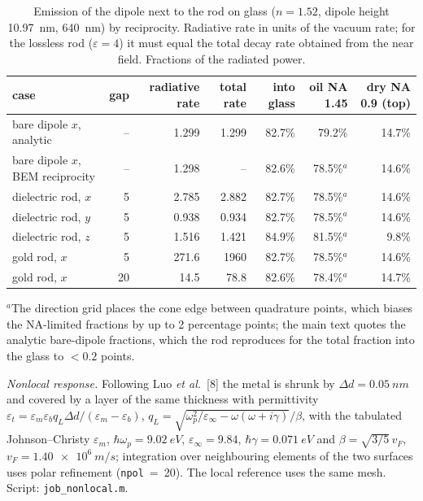 \documentclass[11pt,a4paper]{article}
\begin{document}
\begin{table}[h]\centering
\caption{Emission of the dipole next to the rod on glass ($n=1.52$, dipole height \SI{10.97}{nm}, \SI{640}{nm}) by
reciprocity. Radiative rate in units of the vacuum rate; for the lossless rod ($\varepsilon=4$) it must equal the total
decay rate obtained from the near field. Fractions of the radiated power.}\label{tab:recip}
\begin{tabular}{lrrrrrr}\toprule
case & gap & radiative rate & total rate & into glass & oil NA 1.45 & dry NA 0.9 (top)\\\midrule
bare dipole $x$, analytic & -- & 1.299 & 1.299 & 82.7\% & 79.2\% & 14.7\%\\
bare dipole $x$, BEM reciprocity & -- & 1.298 & -- & 82.6\% & 78.5\%$^a$ & 14.6\%\\
dielectric rod, $x$ & 5 & 2.785 & 2.882 & 82.7\% & 78.5\%$^a$ & 14.6\%\\
dielectric rod, $y$ & 5 & 0.938 & 0.934 & 82.7\% & 78.5\%$^a$ & 14.6\%\\
dielectric rod, $z$ & 5 & 1.516 & 1.421 & 84.9\% & 81.5\%$^a$ & 9.8\%\\
gold rod, $x$ & 5 & 271.6 & 1960 & 82.7\% & 78.5\%$^a$ & 14.6\%\\
gold rod, $x$ & 20 & 14.5 & 78.8 & 82.6\% & 78.4\%$^a$ & 14.7\%\\\bottomrule
\end{tabular}

\smallskip
{\footnotesize $^a$The direction grid places the cone edge between quadrature points, which biases the NA-limited
fractions by up to 2 percentage points; the main text quotes the analytic bare-dipole fractions, which the rod
reproduces for the total fraction into the glass to $<0.2$ points.}
\end{table}

\emph{Nonlocal response.} Following Luo \emph{et al.}~[8] the metal is shrunk by $\Delta d=\SI{0.05}{nm}$ and
covered by a layer of the same thickness with permittivity
$\varepsilon_t=\varepsilon_m\varepsilon_b q_L\Delta d/(\varepsilon_m-\varepsilon_b)$,
$q_L=\sqrt{\omega_p^2/\varepsilon_\infty-\omega(\omega+i\gamma)}/\beta$, with the tabulated Johnson--Christy
$\varepsilon_m$, $\hbar\omega_p=\SI{9.02}{eV}$, $\varepsilon_\infty=9.84$, $\hbar\gamma=\SI{0.071}{eV}$ and
$\beta=\sqrt{3/5}\,v_F$, $v_F=\SI{1.40e6}{m/s}$; integration over neighbouring elements of the two surfaces uses
polar refinement (\texttt{npol}~=~20). The local reference uses the same mesh. Script: \texttt{job\_nonlocal.m}.
\end{document}
